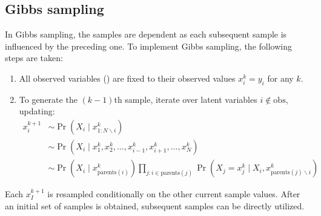 \subsection{Gibbs sampling}
In Gibbs sampling, the samples are dependent as each subsequent sample is influenced by the preceding one. 
To implement Gibbs sampling, the following steps are taken:
\begin{enumerate}
    \item All observed variables () are fixed to their observed values $x_i^k=y_i$ for any $k$. 
    \item To generate the $(k-1)$th sample, iterate over latent variables $i \notin \text{obs}$, updating: 
        \begin{align*}
            x_i^{k+1}   &\sim \Pr\left(X_i\mid x_{1:N\backslash i}^k\right) \\
                        &\sim \Pr\left(X_i\mid x_{1}^k,x_{2}^k,\dots,x_{i-1}^k,x_{i+1}^k,\dots,x_{N}^k\right) \\
                        &\sim \Pr\left(X_i\mid x_{\text{parents}(i)}^k\right)\prod_{j:i \in \text{parents}(j)}\Pr\left(X_j=x_j^k\mid X_i,x_{\text{parents}(j)\backslash i}^k\right)
        \end{align*}
\end{enumerate}
Each $x_I^{k+1}$ is resampled conditionally on the other current sample values.
After an initial set of samples is obtained, subsequent samples can be directly utilized.
